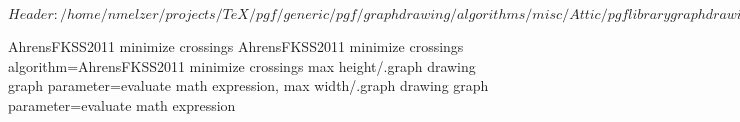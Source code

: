 %
%
%

\ProvidesFileRCS[v\pgfversion] $Header: /home/nmelzer/projects/TeX/pgf/generic/pgf/graphdrawing/algorithms/misc/Attic/pgflibrarygraphdrawing.misc.code.tex,v 1.1 2011/05/09 12:01:09 tantau Exp $




%
%
%
%

\pgfgddeclarealgorithmkey
{AhrensFKSS2011 minimize crossings}
{AhrensFKSS2011 minimize crossings}
{%
  algorithm=AhrensFKSS2011 minimize crossings
}
{%
  max height/.graph drawing graph parameter=evaluate math expression,
  max width/.graph drawing graph parameter=evaluate math expression
}



\endinput